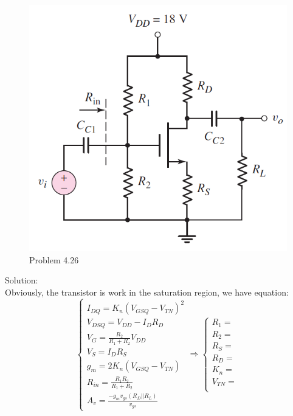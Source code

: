 \documentclass[a4paper,11pt,UTF8]{article}
\begin{document}
\begin{figure}[H] 
	\centering 
	\includegraphics[scale=0.5]{MD4.26.png}
	\caption{Problem 4.26}
\end{figure}
\noindent Solution:\\
Obviously, the transistor is work in the saturation region, we have equation:\\
$$\begin{cases}\displaystyle
	I_{DQ}=K_n(V_{GSQ}-V_{TN})^2\\
	V_{DSQ}=V_{DD}-I_DR_D\\
	\displaystyle V_G=\frac{R_2}{R_1+R_2}V_{DD}\\
	V_S=I_DR_S\\
	g_m=2K_n(V_{GSQ}-V_{TN})\\
	\displaystyle R_{in}=\frac{R_1R_2}{R_1+R_2}\\
	\displaystyle A_v=\frac{-g_mv_{gs}(R_D||R_L)}{v_{gs}}
\end{cases}\Rightarrow
\begin{cases}
	R_1=\\
	R_2=\\
	R_S=\\
	R_D=\\
	K_n=\\
	V_{T N}=\\
\end{cases}$$
\end{document}
